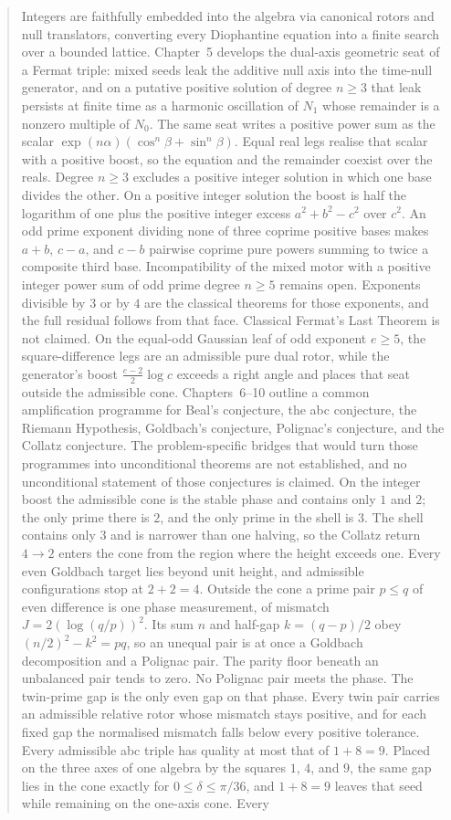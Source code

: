 \documentclass[a4paper]{article}
\theoremstyle{definition}
\theoremstyle{remark}
\begin{document}
\begin{abstract}
Integers are faithfully embedded into the algebra via canonical rotors and null translators, converting every Diophantine equation into a finite search over a bounded lattice. Chapter~5 develops the dual-axis geometric seat of a Fermat triple: mixed seeds leak the additive null axis into the time-null generator, and on a putative positive solution of degree \(n\ge 3\) that leak persists at finite time as a harmonic oscillation of \(N_1\) whose remainder is a nonzero multiple of \(N_0\). The same seat writes a positive power sum as the scalar \(\exp(n\alpha)(\cos^n\beta+\sin^n\beta)\). Equal real legs realise that scalar with a positive boost, so the equation and the remainder coexist over the reals. Degree \(n\ge 3\) excludes a positive integer solution in which one base divides the other. On a positive integer solution the boost is half the logarithm of one plus the positive integer excess \(a^2+b^2-c^2\) over \(c^2\). An odd prime exponent dividing none of three coprime positive bases makes \(a+b\), \(c-a\), and \(c-b\) pairwise coprime pure powers summing to twice a composite third base. Incompatibility of the mixed motor with a positive integer power sum of odd prime degree \(n\ge 5\) remains open. Exponents divisible by \(3\) or by \(4\) are the classical theorems for those exponents, and the full residual follows from that face. Classical Fermat’s Last Theorem is not claimed. On the equal-odd Gaussian leaf of odd exponent \(e\ge 5\), the square-difference legs are an admissible pure dual rotor, while the generator's boost \(\frac{e-2}{2}\log c\) exceeds a right angle and places that seat outside the admissible cone. Chapters~6--10 outline a common amplification programme for Beal’s conjecture, the abc conjecture, the Riemann Hypothesis, Goldbach’s conjecture, Polignac’s conjecture, and the Collatz conjecture. The problem-specific bridges that would turn those programmes into unconditional theorems are not established, and no unconditional statement of those conjectures is claimed. On the integer boost the admissible cone is the stable phase and contains only \(1\) and \(2\); the only prime there is \(2\), and the only prime in the shell is \(3\). The shell contains only \(3\) and is narrower than one halving, so the Collatz return \(4\to 2\) enters the cone from the region where the height exceeds one. Every even Goldbach target lies beyond unit height, and admissible configurations stop at \(2+2=4\). Outside the cone a prime pair \(p\le q\) of even difference is one phase measurement, of mismatch \(J=2(\log(q/p))^2\). Its sum \(n\) and half-gap \(k=(q-p)/2\) obey \((n/2)^2-k^2=pq\), so an unequal pair is at once a Goldbach decomposition and a Polignac pair. The parity floor beneath an unbalanced pair tends to zero. No Polignac pair meets the phase. The twin-prime gap is the only even gap on that phase. Every twin pair carries an admissible relative rotor whose mismatch stays positive, and for each fixed gap the normalised mismatch falls below every positive tolerance. Every admissible abc triple has quality at most that of \(1+8=9\). Placed on the three axes of one algebra by the squares \(1\), \(4\), and \(9\), the same gap lies in the cone exactly for \(0\le\delta\le\pi/36\), and \(1+8=9\) leaves that seed while remaining on the one-axis cone. Every 
\end{abstract}
\end{document}

